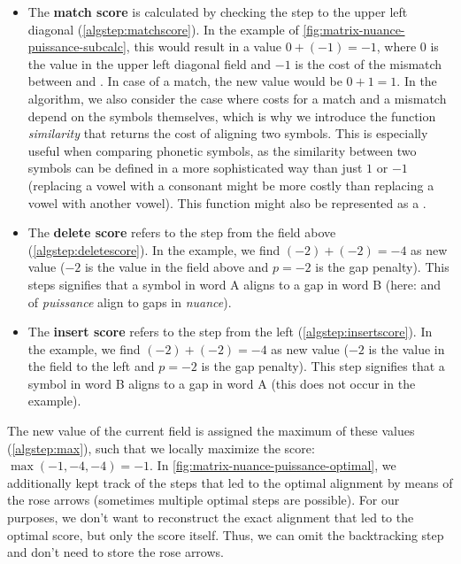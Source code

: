 \begin{itemize}[leftmargin=0cm]

    \item The \textbf{match score} is calculated by checking the step to the upper left diagonal (\autoref{algstep:matchscore}). In the example of \autoref{fig:matrix-nuance-puissance-subcalc}, this would result in a value $0+(-1) = -1$, where $0$ is the value in the upper left diagonal field and $-1$ is the cost of the mismatch between  and . In case of a match, the new value would be $0 + 1 = 1$. In the algorithm, we also consider the case where costs for a match and a mismatch depend on the symbols themselves, which is why we introduce the function \textit{similarity} that returns the cost of aligning two symbols. This is especially useful when comparing phonetic symbols, as the similarity between two symbols can be defined in a more sophisticated way than just $1$ or $-1$ (\eg replacing a vowel with a consonant might be more costly than replacing a vowel with another vowel). This function might also be represented as a .
    
    \item The \textbf{delete score} refers to the step from the field above (\autoref{algstep:deletescore}). In the example, we find $(-2) + (-2) = -4$ as new value ($-2$ is the value in the field above and $p=-2$ is the gap penalty). This steps signifies that a symbol in word A aligns to a gap in word B (here:  and  of \textit{puissance} align to gaps in \textit{nuance}).
    
    \item The \textbf{insert score} refers to the step from the left (\autoref{algstep:insertscore}). In the example, we find $(-2) + (-2) = -4$ as new value ($-2$ is the value in the field to the left and $p=-2$ is the gap penalty). This step signifies that a symbol in word B aligns to a gap in word A (this does not occur in the example).

\end{itemize}

The new value of the current field is assigned the maximum of these values (\autoref{algstep:max}), such that we locally maximize the score: $\max(-1, -4, -4) = -1$. In \autoref{fig:matrix-nuance-puissance-optimal}, we additionally kept track of the steps that led to the optimal alignment by means of the rose arrows (sometimes multiple optimal steps are possible). For our purposes, we don't want to reconstruct the exact alignment that led to the optimal score, but only the score itself. Thus, we can omit the backtracking step and don't need to store the rose arrows.

